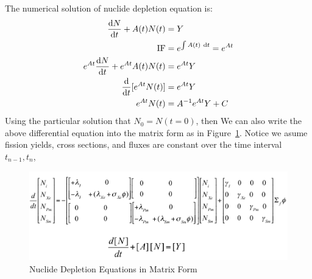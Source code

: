 \documentclass{school-22.211-notes}
\begin{document}
\clearpage
{}
The numerical solution of nuclide depletion equation is:
\begin{align}
\frac{\mathrm{d}N}{\mathrm{d}t} + A(t) N(t) &= Y \\
\mbox{IF} &= e^{\int A(t) \mbox{ }\mathrm{d} t} = e^{At} \\
e^{At} \frac{\mathrm{d}N}{\mathrm{d}t} + e^{At} A(t) N(t) &= e^{At} Y \\
\frac{\mathrm{d}}{\mathrm{d}t}[e^{At} N(t) ] &= e^{At} Y \\
e^{At} N(t) &= A^{-1} e^{At} Y + C 
\end{align}
Using the particular solution that $N_0 = N(t=0)$, then 
We can also write the above differential equation into the matrix form as in Figure~\ref{depletion-matrix}. Notice we asume fission yields, cross sections, and fluxes are constant over the time interval $t_{n-1}, t_n$,
\begin{figure}[ht]
  \centering
  \includegraphics[width=5in]{images/dfs/depletion-matrix-form.png}
  \caption{Nuclide Depletion Equations in Matrix Form} \label{depletion-matrix} 
\end{figure}
\end{document}
